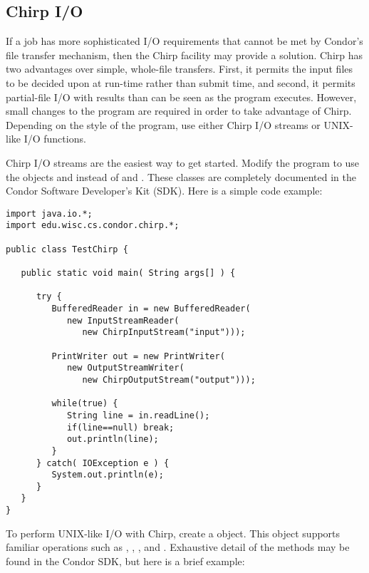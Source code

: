 \subsection{Chirp I/O}

If a job has more sophisticated I/O requirements that cannot
be met by Condor's file transfer mechanism,
then the Chirp facility may provide a solution.
Chirp has two advantages over simple, whole-file transfers.
First, it permits the input files to be decided upon at run-time
rather than submit time, and second,
it permits partial-file I/O with results than can be seen as the
program executes.
However, small changes to the program are required
in order to take advantage of Chirp.
Depending on the style of the program, use either Chirp I/O streams
or UNIX-like I/O functions.

Chirp I/O streams are the easiest way to get started.
Modify the program to use the objects 
and  instead of  and
.
These classes are completely documented
in the Condor Software Developer's Kit (SDK).
Here is a simple code example:

\begin{verbatim}
import java.io.*;
import edu.wisc.cs.condor.chirp.*;

public class TestChirp {

   public static void main( String args[] ) {

      try {
         BufferedReader in = new BufferedReader(
            new InputStreamReader(
               new ChirpInputStream("input")));

         PrintWriter out = new PrintWriter(
            new OutputStreamWriter(
               new ChirpOutputStream("output")));

         while(true) {
            String line = in.readLine();
            if(line==null) break;
            out.println(line);
         }
      } catch( IOException e ) {
         System.out.println(e);
      }
   }
}
\end{verbatim}

To perform UNIX-like I/O with Chirp,
create a  object.
This object supports familiar operations such as , ,
, and .
Exhaustive detail of the methods may be found in the Condor 
SDK, but here is a brief example:

